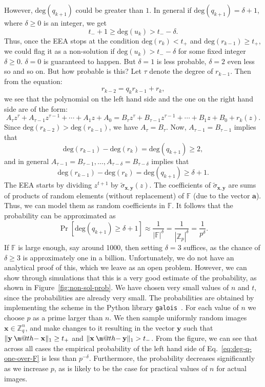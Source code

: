 \documentclass[pdflatex,sn-mathphys-num]{sn-jnl}
\makeatletter
\newcommand{\dotdiv}{\mathbin{\text{\@dotdiv}}}
\newcommand{\@dotdiv}{%
  \ooalign{\hidewidth\raise1ex\hbox{.}\hidewidth\cr$\m@th-$\cr}%
}
\theoremstyle{definition}
\newcommand{\vtr}[1]{\mathbf{#1}}
\newcommand{\norm}[1]{\lVert{#1}\rVert}
\makeatother
\begin{document}
However, $ \text{deg}(q_{k+1})$ could be greater than $1$. In general if $ \text{deg}(q_{k+1}) = \delta + 1$, where $\delta \geq 0$ is an integer, we get 
\[
t_- + 1 \geq \text{deg}(u_k) > t_- - \delta.
\]
Thus, once the EEA stops at the condition $\text{deg}(r_k) < t_+$ and $\text{deg}(r_{k-1}) \geq t_{+}$, we could flag it as a non-solution if $\text{deg}(u_k) > t_- -\delta$ for some fixed integer $\delta \geq 0$. $\delta = 0$ is guaranteed to happen. But $\delta = 1$ is less probable, $\delta = 2$ even less so and so on. But how probable is this? Let $\tau$ denote the degree of $r_{k-1}$. Then from the equation:
\[
r_{k-2} = q_{k} r_{k-1} + r_{k},
\]
we see that the polynomial on the left hand side and the one on the right hand side are of the form:
\[
A_\tau z^\tau + A_{\tau - 1} z^{\tau - 1} + \cdots + A_1 z + A_0 = B_\tau z^\tau + B_{\tau - 1} z^{\tau - 1} + \cdots + B_1 z + B_0 + r_{k}(z).
\]
Since $\text{deg}(r_{k-2}) > \text{deg}(r_{k-1})$, we have $A_\tau = B_\tau$. Now, $A_{\tau - 1} = B_{\tau - 1}$ implies that 
\[
\text{deg}(r_{k-1}) - \text{deg}(r_{k}) = \text{deg}(q_{k+1}) \geq 2,
\]
and in general $A_{\tau - 1} = B_{\tau - 1}, \ldots, A_{\tau - \delta} = B_{\tau - \delta}$ implies that 
\[
\text{deg}(r_{k-1}) - \text{deg}(r_{k}) = \text{deg}(q_{k+1}) \geq \delta + 1.
\]
The EEA starts by dividing $z^{t+1}$ by $\tilde{\sigma}_{\vtr{x}, \vtr{y}}(z)$. The coefficients of $\tilde{\sigma}_{\vtr{x}, \vtr{y}}$ are sums of products of random elements (without replacement) of $\mathbb{F}$ (due to the vector $\vtr{a}$). Thus, we can model them as random coefficients in $\mathbb{F}$. It follows that the probability can be approximated as
\begin{equation}
\label{eq:deg-q-one-over-F}
 \Pr[\text{deg}(q_{k+1}) \geq \delta + 1 ] \approx \frac{1}{|\mathbb{F}|^\delta} = \frac{1}{|\mathbb{Z}_p|^\delta} = \frac{1}{p^\delta}.   
\end{equation}
If $\mathbb{F}$ is large enough, say around 1000, then setting $\delta = 3$ suffices, as the chance of $\delta \geq 3$ is approximately one in a billion. Unfortunately, we do not have an analytical proof of this, which we leave as an open problem. However, we can show through simulations that this is a very good estimate of the probability, as shown in Figure~\ref{fig:non-sol-prob}. We have chosen very small values of $n$ and $t$, since the probabilities are already very small. The probabilities are obtained by implementing the scheme in the Python library \verb+galois+~\cite{Hostetter_Galois_2020}. For each value of $n$ we choose $p$ as a prime larger than $n$. We then sample uniformly random images $\vtr{x} \in \mathbb{Z}_q^n$, and make changes to it resulting in the vector $\vtr{y}$ such that $\norm{\vtr{y} \dotdiv \vtr{x}}_1 \geq t_+$ and $\norm{\vtr{x} \dotdiv \vtr{y}}_1 > t_-$. From the figure, we can see that across all cases the empirical probability of the left hand side of Eq.~\ref{eq:deg-q-one-over-F} is less than $p^{-\delta}$. Furthermore, the probability decreases significantly as we increase $p$, as is likely to be the case for practical values of $n$ for actual images.
 
\end{document}

